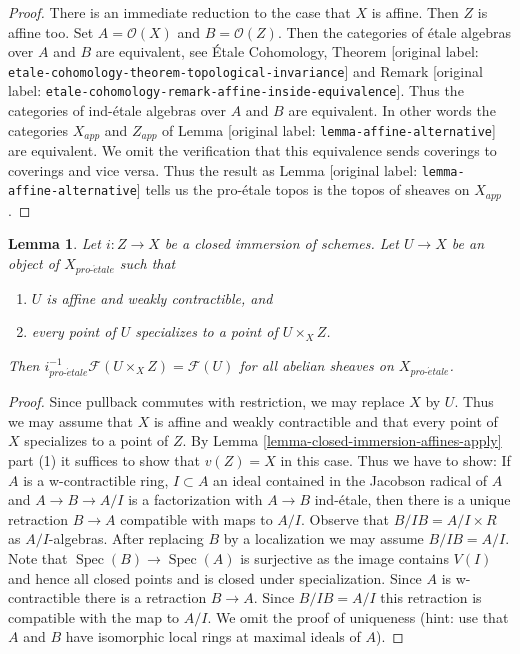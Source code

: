 \documentclass[10pt,a4paper]{article}
\theoremstyle{plain}
\newtheorem{lemma}[subsection]{Lemma}
\theoremstyle{definition}
\theoremstyle{remark}
\numberwithin{equation}{subsection}
\def\Spec{\mathop{\mathrm{Spec}}}
\def\proetale{{pro\text{-}\acute{e}tale}}
\begin{document}
\begin{proof}
There is an immediate reduction to the case that $X$ is affine.
Then $Z$ is affine too. Set $A = \mathcal{O}(X)$ and $B = \mathcal{O}(Z)$.
Then the categories of \'etale algebras over
$A$ and $B$ are equivalent, see 
\'Etale Cohomology, Theorem
[original label: \nolinkurl{etale-cohomology-theorem-topological-invariance}] and
Remark [original label: \nolinkurl{etale-cohomology-remark-affine-inside-equivalence}].
Thus the categories of ind-\'etale algebras over $A$ and $B$ are
equivalent. In other words the categories $X_{app}$ and $Z_{app}$
of Lemma [original label: \nolinkurl{lemma-affine-alternative}] are equivalent.
We omit the verification
that this equivalence sends coverings to coverings and vice versa.
Thus the result as Lemma [original label: \nolinkurl{lemma-affine-alternative}]
tells us the pro-\'etale topos is the topos of sheaves on $X_{app}$.
\end{proof}

\begin{lemma}
\label{lemma-compute-i-star}
Let $i : Z \to X$ be a closed immersion of schemes.
Let $U \to X$ be an object of $X_\proetale$ such that
\begin{enumerate}
\item $U$ is affine and weakly contractible, and
\item every point of $U$ specializes to a point of $U \times_X Z$.
\end{enumerate}
Then $i_\proetale^{-1}\mathcal{F}(U \times_X Z) = \mathcal{F}(U)$
for all abelian sheaves on $X_\proetale$.
\end{lemma}

\begin{proof}
Since pullback commutes with restriction, we may replace $X$ by $U$.
Thus we may assume that $X$ is affine and weakly contractible
and that every point of $X$ specializes to a point of $Z$.
By Lemma \ref{lemma-closed-immersion-affines-apply} part (1)
it suffices to show that $v(Z) = X$ in this case.
Thus we have to show: If $A$ is a w-contractible ring, $I \subset A$
an ideal contained in the Jacobson radical of $A$ and $A \to B \to A/I$
is a factorization with $A \to B$ ind-\'etale, then there is
a unique retraction $B \to A$ compatible with maps to $A/I$.
Observe that $B/IB = A/I \times R$ as $A/I$-algebras.
After replacing $B$ by a localization we may assume $B/IB = A/I$.
Note that $\Spec(B) \to \Spec(A)$ is surjective as the image
contains $V(I)$ and hence all closed points and is closed under
specialization. Since $A$ is w-contractible there is a retraction $B \to A$.
Since $B/IB = A/I$ this retraction is compatible with the map to $A/I$.
We omit the proof of uniqueness (hint: use that $A$ and $B$ have
isomorphic local rings at maximal ideals of $A$).
\end{proof}
\end{document}
